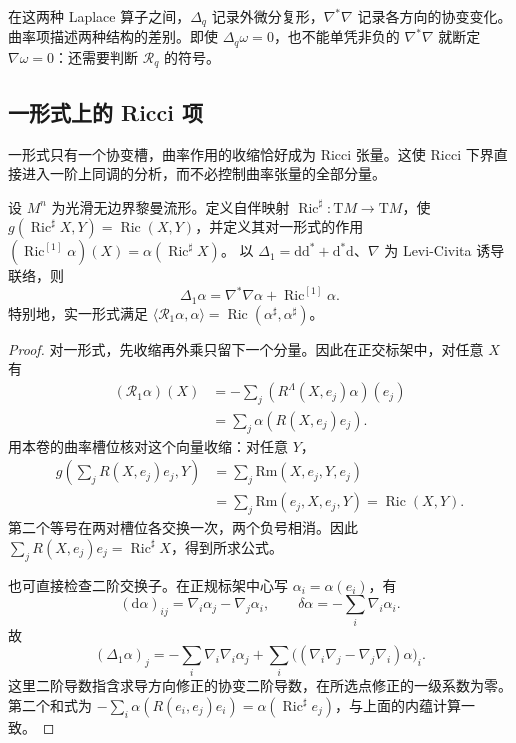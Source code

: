 在这两种 Laplace 算子之间，\(\Delta_q\) 记录外微分复形，\(\nabla^*\nabla\) 记录各方向的协变变化。曲率项描述两种结构的差别。即使 \(\Delta_q\omega=0\)，也不能单凭非负的 \(\nabla^*\nabla\) 就断定 \(\nabla\omega=0\)：还需要判断 \(\mathcal R_q\) 的符号。

\subsection{一形式上的 Ricci 项}
\label{g3:subsec:1503:02}
一形式只有一个协变槽，曲率作用的收缩恰好成为 Ricci 张量。这使 Ricci 下界直接进入一阶上同调的分析，而不必控制曲率张量的全部分量。

\begin{theorem}\label{g3:thm:weitzenbock-one-form}
	设 \(M^n\) 为光滑无边界黎曼流形。定义自伴映射
	\(\operatorname{Ric}^{\sharp}:\mathrm TM\to\mathrm TM\)，使
	\(g(\operatorname{Ric}^{\sharp}X,Y)=\operatorname{Ric}(X,Y)\)，并定义其对一形式的作用
	\((\operatorname{Ric}^{[1]}\alpha)(X)=\alpha(\operatorname{Ric}^{\sharp}X)\)。
	以 \(\Delta_1=\mathrm d\mathrm d^*+\mathrm d^*\mathrm d\)、\(\nabla\) 为 Levi-Civita 诱导联络，则
	\begin{equation}\label{g3:eq:weitzenbock-one-form}
		\Delta_1\alpha=\nabla^*\nabla\alpha+\operatorname{Ric}^{[1]}\alpha.
	\end{equation}
	特别地，实一形式满足
	\(\langle\mathcal R_1\alpha,\alpha\rangle
	=\operatorname{Ric}(\alpha^\sharp,\alpha^\sharp)\)。
\end{theorem}
\begin{proof}
	对一形式，先收缩再外乘只留下一个分量。因此在正交标架中，对任意 \(X\) 有
	\[
		\begin{split}
		(\mathcal R_1\alpha)(X)
		&=-\sum_j(R^\Lambda(X,e_j)\alpha)(e_j)\\
		&=\sum_j\alpha(R(X,e_j)e_j).
		\end{split}
	\]
	用本卷的曲率槽位核对这个向量收缩：对任意 \(Y\)，
	\[
		\begin{split}
		g\left(\sum_jR(X,e_j)e_j,Y\right)
		&=\sum_j\mathrm{Rm}(X,e_j,Y,e_j)\\
		&=\sum_j\mathrm{Rm}(e_j,X,e_j,Y)
		=\operatorname{Ric}(X,Y).
		\end{split}
	\]
	第二个等号在两对槽位各交换一次，两个负号相消。因此
	\(\sum_jR(X,e_j)e_j=\operatorname{Ric}^{\sharp}X\)，得到所求公式。

	也可直接检查二阶交换子。在正规标架中心写
	\(\alpha_i=\alpha(e_i)\)，有
	\[
		(\mathrm d\alpha)_{ij}=\nabla_i\alpha_j-\nabla_j\alpha_i,
		\qquad \delta\alpha=-\sum_i\nabla_i\alpha_i.
	\]
	故
	\[
		(\Delta_1\alpha)_j
		=-\sum_i\nabla_i\nabla_i\alpha_j
		  +\sum_i\bigl((\nabla_i\nabla_j-\nabla_j\nabla_i)\alpha\bigr)_i.
	\]
	这里二阶导数指含求导方向修正的协变二阶导数，在所选点修正的一级系数为零。第二个和式为
	\(-\sum_i\alpha(R(e_i,e_j)e_i)
	 =\alpha(\operatorname{Ric}^{\sharp}e_j)\)，与上面的内蕴计算一致。
\end{proof}

